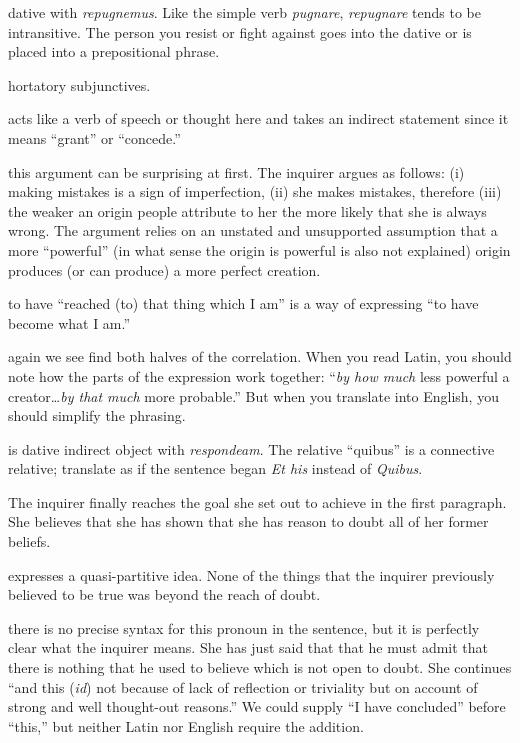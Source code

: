  dative with \textit{repugnemus}. Like the simple verb \textit{pugnare}, \textit{repugnare} tends to be intransitive. The person you resist or fight against goes into the dative or is placed into a prepositional phrase.

 hortatory subjunctives.

 acts like a verb of speech or thought here and takes an indirect statement since it means ``grant'' or ``concede.''

 this argument can be surprising at first. The inquirer argues as follows: (i) making mistakes is a sign of imperfection, (ii) she makes mistakes, therefore (iii) the weaker an origin people attribute to her the more likely that she is always wrong. The argument relies on an unstated and unsupported assumption that a more ``powerful'' (in what sense the origin is powerful is also not explained) origin produces (or can produce) a more perfect creation.

 to have ``reached (to) that thing which I am'' is a way of expressing ``to have become what I am.''

 again we see find both halves of the correlation.  When you read Latin, you should note how the parts of the expression work together: ``\textit{by how much} less powerful a creator\dots \textit{by that much} more probable.'' But when you translate into English, you should simplify the phrasing.

 is dative indirect object with \textit{respondeam}. The relative ``quibus'' is a connective relative; translate as if the sentence began \textit{Et his} instead of \textit{Quibus}.

 The inquirer finally reaches the goal she set out to achieve in the first paragraph. She believes that she has shown that she has reason to doubt all of her former beliefs.

 expresses a quasi-partitive idea. None of the things that the inquirer previously believed to be true was beyond the reach of doubt.

 there is no precise syntax for this pronoun in the sentence, but it is perfectly clear what the inquirer means. She has just said that that he must admit that there is nothing that he used to believe which is not open to doubt. She continues ``and this (\textit{id}) not because of lack of reflection or triviality but on account of strong and well thought-out reasons.'' We could supply ``I have concluded'' before ``this,'' but neither Latin nor English require the addition.

